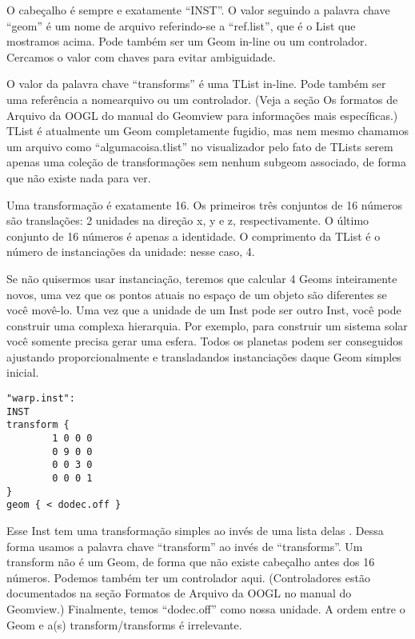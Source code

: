 \documentclass[12pt,a4paper]{book}
\begin{document}
O cabe\c{c}alho \'e sempre e exatamente ``INST''. O valor seguindo a palavra chave
``geom'' \'e um nome de arquivo referindo-se a ``ref.list'', que \'e o List que
mostramos acima.  Pode tamb\'em ser um Geom in-line ou um controlador. Cercamos
o valor com chaves para evitar ambiguidade.

O valor da palavra chave ``transforms'' \'e uma TList in-line. Pode
tamb\'em ser uma refer\^encia a nomearquivo ou um controlador. (Veja a se\c{c}\~ao Os formatos de
Arquivo da OOGL do manual do Geomview para informa\c{c}\~oes mais espec\'ificas.) TList \'e atualmente um
Geom completamente fugidio, mas nem mesmo chamamos um arquivo como ``algumacoisa.tlist'' no
visualizador pelo fato de TLists serem apenas uma cole\c{c}\~ao de transforma\c{c}\~oes sem nenhum
subgeom associado, de forma que n\~ao existe nada para ver.

Uma transforma\c{c}\~ao \'e exatamente 16. Os primeiros tr\^es conjuntos de 16 n\'umeros s\~ao transla\c{c}\~oes:
2 unidades na dire\c{c}\~ao x, y e z, respectivamente. O \'ultimo conjunto de 16 n\'umeros \'e apenas
a identidade. O comprimento da TList \'e o n\'umero de instancia\c{c}\~oes da unidade: nesse caso, 4.

Se n\~ao quisermos usar instancia\c{c}\~ao, teremos que calcular 4
Geoms inteiramente novos, uma vez que os pontos atuais no espa\c{c}o de um objeto s\~ao
diferentes se voc\^e mov\^e-lo. Uma vez que a unidade de um Inst pode ser outro
Inst, voc\^e pode construir uma complexa hierarquia. Por exemplo, para construir um
sistema solar voc\^e somente precisa gerar uma esfera. Todos os planetas podem ser
conseguidos ajustando proporcionalmente e transladandos instancia\c{c}\~oes daque Geom simples inicial.

\begin{verbatim}
"warp.inst":
INST
transform {
		1 0 0 0
		0 9 0 0
		0 0 3 0
		0 0 0 1
}
geom { < dodec.off }
\end{verbatim}

Esse Inst tem uma transforma\c{c}\~ao simples ao inv\'es de uma lista delas . Dessa forma
usamos a palavra chave ``transform'' ao inv\'es de ``transforms''. Um transform n\~ao
\'e um Geom, de forma que n\~ao existe cabe\c{c}alho antes dos 16 n\'umeros. Podemos tamb\'em
ter um controlador aqui.  (Controladores est\~ao documentados na se\c{c}\~ao Formatos de Arquivo da
OOGL no manual do Geomview.) Finalmente, temos ``dodec.off'' como nossa
unidade.  A ordem entre o Geom e a(s) transform/transforms \'e
irrelevante.
\end{document}
